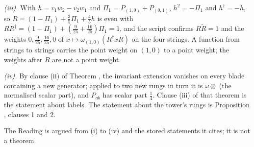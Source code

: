 \emph{(iii).} With $h = v_{1}w_{2} - v_{2}w_{1}$ and $\Pi_{1} = P_{(1,0)} + P_{(0,1)}$, $h^{2} = -\Pi_{1}$ and $h^{\dagger} = -h$, so $R = (1 - \Pi_{1}) + \tfrac35\Pi_{1} + \tfrac45 h$ is even with $RR^{\dagger} = (1 - \Pi_{1}) + (\tfrac{9}{25} + \tfrac{16}{25})\Pi_{1} = 1$, and the script confirms $R\tilde{R} = 1$ and the weights $0, \tfrac{9}{25}, \tfrac{16}{25}, 0$ of $x \mapsto \omega_{(1,0)}(R^{\dagger}xR)$ on the four strings. A function from strings to strings carries the point weight on $(1,0)$ to a point weight; the weights after $R$ are not a point weight.

\emph{(iv).} By clause (ii) of Theorem , the invariant extension vanishes on every blade containing a new generator; applied to two new rungs in turn it is $\omega \otimes$ (the normalised scalar part), and $P_{ab}$ has scalar part $\tfrac14$. Clause (iii) of that theorem is the statement about labels. The statement about the tower's rungs is Proposition , clauses 1 and 2.

The Reading is argued from (i) to (iv) and the stored statements it cites; it is not a theorem.
